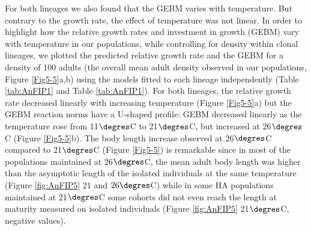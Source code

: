 For both lineages we also found that the GEBM varies with temperature. But
contrary to the growth rate, the effect of temperature was not linear. In order
to highlight how the relative growth rates and investment in growth (GEBM) vary
with temperature in our populations, while controlling for density within clonal
lineages, we plotted the predicted relative growth rate and the GEBM for a
density of 100 adults (the overall mean adult density observed in our
populations, Figure \ref{Fig5-5}a,b) using the models fitted to each lineage
independently (Table \ref{tab:AnFIP1} and Table \ref{tab:AnFIP1}). For both
lineages, the relative growth rate decreased linearly with increasing
temperature (Figure \ref{Fig5-5}a) but the GEBM reaction norms have a U-shaped
profile: GEBM decreased linearly as the temperature rose from 11$\degres$C to
21$\degres$C, but increased at 26$\degres$C (Figure \ref{Fig5-5}b). The body
length increase observed at 26$\degres$C compared to 21$\degres$C (Figure
\ref{Fig5-5}) is remarkable since in most of the populations maintained at
26$\degres$C, the mean adult body length was higher than the asymptotic length
of the isolated individuals at the same temperature (Figure \ref{fig:AnFIP5}
$21$ and $26\degres$C) while in some HA populations maintained at 21$\degres$C
some cohorts did not even reach the length at maturity measured on isolated individuals (Figure
\ref{fig:AnFIP5} 21$\degres$C, negative values).

